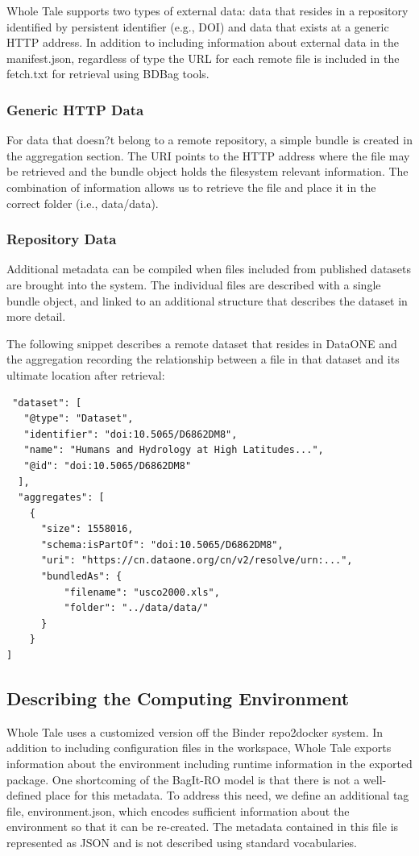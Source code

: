 \documentclass[conference]{IEEEtran}
\begin{document}
Whole Tale supports two types of external data: data that resides in a repository identified by 
persistent identifier (e.g., DOI) and data that exists at a generic HTTP address. In addition to 
including information about external data in the manifest.json, regardless of type the URL for 
each remote file is included in the fetch.txt for retrieval using BDBag tools.

\subsubsection{Generic HTTP Data}
For data that doesn?t belong to a remote repository, a simple bundle is created in the aggregation section. The URI points to the HTTP address where the file may be retrieved and the bundle object holds the filesystem relevant information. The combination of information allows us to retrieve the file and place it in the correct folder (i.e., data/data).

\subsubsection{Repository Data}
Additional metadata can be compiled when files included from published datasets are brought into 
the system. The individual files are described with a single bundle object, and linked to an 
additional structure that describes the dataset in more detail.

The following snippet describes a remote dataset that resides in DataONE and the aggregation 
recording the relationship between a file in that dataset and its ultimate location after 
retrieval:


\begin{lstlisting}
 "dataset": [
   "@type": "Dataset",
   "identifier": "doi:10.5065/D6862DM8",
   "name": "Humans and Hydrology at High Latitudes...",
   "@id": "doi:10.5065/D6862DM8"
  ],
  "aggregates": [
    {
      "size": 1558016,
      "schema:isPartOf": "doi:10.5065/D6862DM8",
      "uri": "https://cn.dataone.org/cn/v2/resolve/urn:...",
      "bundledAs": {
          "filename": "usco2000.xls",
          "folder": "../data/data/"
      }
    }
]
\end{lstlisting}

\subsection{Describing the Computing Environment}
Whole Tale uses a customized version off the Binder repo2docker system. In addition to including 
configuration files in the workspace, Whole Tale exports information about the environment 
including runtime information in the exported package. One shortcoming of the BagIt-RO model is 
that there is not a well-defined place for this metadata. To address this need, we define an 
additional tag file, environment.json, which encodes sufficient information about the environment 
so that it can be re-created. The metadata contained in this file is represented as JSON and is 
not described using standard vocabularies. 
\end{document}
